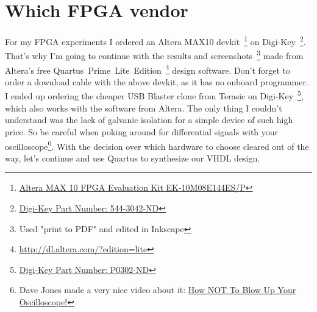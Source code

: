 \documentclass[a4paper]{article}
\begin{document}
\section{Which FPGA vendor}
For my FPGA experiments I ordered an Altera MAX10 devkit~\footnote{\href{https://www.altera.com/products/boards_and_kits/dev-kits/altera/kit-max-10-evaluation.html}{Altera MAX 10 FPGA Evaluation Kit EK-10M08E144ES/P}} on Digi-Key~\footnote{\href{http://www.digikey.de/short/3pd4ch}{Digi-Key Part Number: 544-3042-ND}}.
That's why I'm going to continue with the results and screenshots~\footnote{Used "print to PDF" and edited in Inkscape} made from Altera's free Quartus~Prime~Lite~Edition~\footnote{\url{http://dl.altera.com/?edition=lite}} design software.
Don't forget to order a download cable with the above devkit, as it has no onboard programmer.
I ended up ordering the cheaper USB Blaster clone from Terasic on Digi-Key~\footnote{\href{http://www.digikey.de/short/3pd4j9}{Digi-Key Part Number: P0302-ND}}, which also works with the software from Altera.
The only thing I couldn't understand was the lack of galvanic isolation for a simple device of such high price.
So be careful when poking around for differential signals with your oscilloscope\footnote{Dave Jones made a very nice video about it: \href{https://youtu.be/xaELqAo4kkQ}{How NOT To Blow Up Your Oscilloscope!}}.
With the decision over which hardware to choose cleared out of the way, let's continue and use Quartus to synthesize our VHDL design.
\newpage
\end{document}
